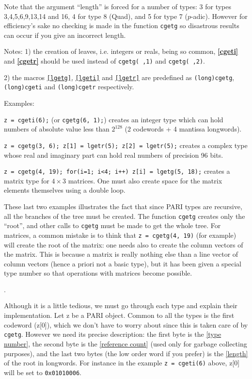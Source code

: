 Note that the argument ``length'' is forced for a number of types:
3 for types 3,4,5,6,9,13,14 and 16, 4 for type 8 (Quad), and 5 for type 7 ($p$-adic).
However for efficiency's sake no checking is made in the function {\tt cgetg} so
disastrous results can occur if you give an incorrect length.

Notes: 1) the creation of leaves, i.e. integers or reals, being so common,
{\bf \ref{cgeti}} and {\bf \ref{cgetr}} should be used instead of 
{\tt cgetg( ,1)} and {\tt cgetg( ,2)}.

2) the macros {\tt \ref{lgetg}}, {\tt \ref{lgeti}} and {\tt \ref{lgetr}} are predefined as
{\tt (long)cgetg}, {\tt (long)cgeti} and {\tt (long)cgetr} respectively.

Examples:

{\tt z = cgeti(6);} (or {\tt cgetg(6, 1);}) creates an integer type which
can hold numbers of absolute value less than $2^{128}$ (2 codewords +
4 mantissa longwords).

{\tt z = cgetg(3, 6); z[1] = lgetr(5); z[2] = lgetr(5);}
creates a complex type whose real and imaginary part can hold real numbers
of precision 96 bits.

{\tt z = cgetg(4, 19); for(i=1; i<4; i++) z[i] = lgetg(5, 18);}
creates a matrix type for $4\times 3$ matrices. One must also create space
for the matrix elements themselves using a double loop.

These last two examples illustrates the fact that since PARI types are recursive,
all the branches of the tree must be created. The function {\tt cgetg} creates only the
``root'', and other calls to {\tt cgetg} must be made to get the whole tree.
For matrices, a common mistake is to think that {\tt z = cgetg(4, 19)}
(for example) will create the root of the matrix: one needs also to create 
the column vectors of the
matrix. This is because a matrix is really nothing else than a line vector of
column vectors (hence a priori not a basic type), but it has been given a special
type number so that operations with matrices become possible.

.

Although it is a little tedious, we must go through each type and explain their
implementation. Let z be a PARI object. Common to all the types is the first
codeword (z[0]), which we don't have to worry about since this is taken care of
by {\tt cgetg}. However we need its precise description: the first
byte is the \ref{type number}, the second byte is the \ref{reference count} (used only
for garbage collecting purposes), and the last two bytes (the low order word if
you prefer) is the \ref{length} of the root in longwords. For instance in the example
{\tt z = cgeti(6)} above, z[0] will be set to {\tt 0x01010006}.

